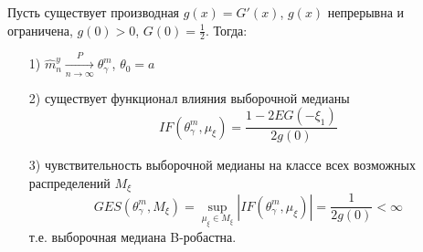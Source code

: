 \begin{theorem}[]\label{lec:9/the:1}
	Пусть существует производная $g(x) = G' (x)$, $g(x)$ непрерывна и ограничена, $g(0) > 0$, $G(0) = \frac{1}{2}$. Тогда:
	\begin{itemize}
		\item[1)] $\hat{m}_n^y \xrightarrow[n \to \infty]{P}\theta_{\gamma}^m$, $\theta_0 = a$
		\item[2)] существует функционал влияния выборочной медианы
		$$IF (\theta_{\gamma}^m, \mu_{\xi}) = \frac{1 - 2 E G(-\xi_1)}{2 g(0)}$$
		\item[3)] чувствительность выборочной медианы на классе всех возможных распределений $M_{\xi}$
		$$GES (\theta_{\gamma}^m, M_{\xi}) = \underset{\mu_{\xi} \in M_{\xi}}{\sup}|IF (\theta_{\gamma}^m, \mu_{\xi})| = \frac{1}{2 g(0)} < \infty$$
		т.е. выборочная медиана B-робастна.
	\end{itemize}
\end{theorem}
